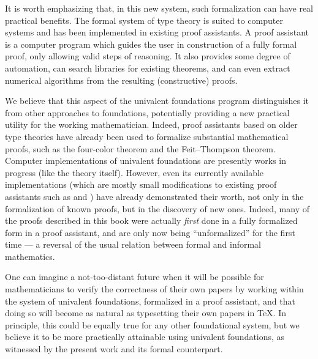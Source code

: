 It is worth emphasizing that, in this new system, such formalization can have real practical benefits.
The formal system of type theory is suited to computer systems and has been implemented in existing proof assistants.
%
A proof assistant is a computer program which guides the user in construction of a fully formal proof, only allowing valid steps of reasoning.
It also provides some degree of automation, can search libraries for existing theorems, and can even extract numerical algorithms  from the resulting (constructive) proofs.

We believe that this aspect of the univalent foundations program distinguishes it from other approaches to foundations, potentially providing a new practical utility for the working mathematician.
Indeed, proof assistants based on older type theories have already been used to formalize substantial mathematical proofs, such as the four-color theorem  and the Feit--Thompson theorem.
Computer implementations of univalent foundations are presently works in progress (like the theory itself).
%
However, even its currently available implementations (which are mostly small modifications to existing proof assistants such as \Coq and 
\Agda) have already demonstrated their worth, not only in the formalization of known proofs, but in the discovery of new ones.
Indeed, many of the proofs described in this book were actually \emph{first} done in a fully formalized form in a proof assistant, and are only now being ``unformalized'' for the first time --- a reversal of the usual relation between formal and informal mathematics.

One can imagine a not-too-distant future when it will be possible for mathematicians to verify the correctness of their own papers by working within the system of univalent foundations, formalized in a proof assistant, and that doing so will become as natural as typesetting their own papers in \TeX.
In principle, this could be equally true for any other foundational system, but we believe it to be more practically attainable using univalent foundations, as witnessed by the present work and its formal counterpart.

%
%
%
%


